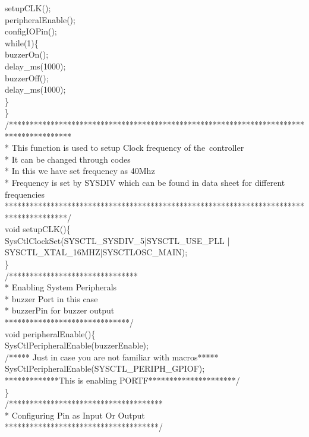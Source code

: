 \documentclass[a4paper,10pt,oneside]{article}
\begin{document}
				setupCLK();\\
				peripheralEnable();\\
				configIOPin();\\
				while(1)\{\\
					buzzerOn();\\
					delay\_ms(1000);\\
					buzzerOff();\\
					delay\_ms(1000);\\
			\}\\
			\}\\
			/***************************************************************************************\\
			* This function is used to setup Clock frequency of the\ controller\\
			* It can be changed through codes\\
			* In this we have set frequency as 40Mhz\\
			* Frequency is set by SYSDIV which can be found in data sheet for different frequencies\\
			***************************************************************************************/\\
			void setupCLK()\{\\
				SysCtlClockSet(SYSCTL\_SYSDIV\_5|SYSCTL\_USE\_PLL | SYSCTL\_XTAL\_16MHZ|SYSCTLOSC\_MAIN);\\
			\}\\
			/*******************************\\
			* Enabling System Peripherals\\
			* buzzer Port in this case\\
			* buzzerPin for buzzer output\\
			******************************/\\
			void peripheralEnable()\{\\
				SysCtlPeripheralEnable(buzzerEnable);\\
				/***** Just in case you are not familiar with macros*****
				SysCtlPeripheralEnable(SYSCTL\_PERIPH\_GPIOF);\\
				*************This is enabling PORTF*********************/\\
			\}\\
			/*************************************\\
			* Configuring Pin as Input Or Output\\
			*************************************/\\
\end{document}
